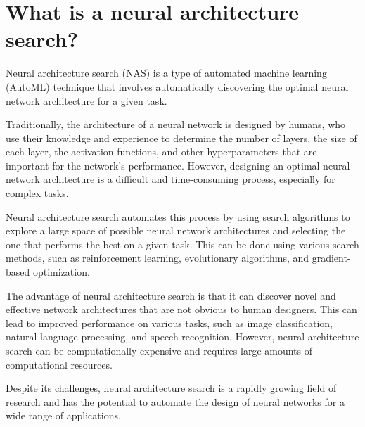 \section{What is a neural architecture search?}
Neural architecture search (NAS) is a type of automated machine learning (AutoML) technique that involves automatically discovering the optimal neural network architecture for a given task.

Traditionally, the architecture of a neural network is designed by humans, who use their knowledge and experience to determine the number of layers, the size of each layer, the activation functions, and other hyperparameters that are important for the network's performance. However, designing an optimal neural network architecture is a difficult and time-consuming process, especially for complex tasks.

Neural architecture search automates this process by using search algorithms to explore a large space of possible neural network architectures and selecting the one that performs the best on a given task. This can be done using various search methods, such as reinforcement learning, evolutionary algorithms, and gradient-based optimization.

The advantage of neural architecture search is that it can discover novel and effective network architectures that are not obvious to human designers. This can lead to improved performance on various tasks, such as image classification, natural language processing, and speech recognition. However, neural architecture search can be computationally expensive and requires large amounts of computational resources.

Despite its challenges, neural architecture search is a rapidly growing field of research and has the potential to automate the design of neural networks for a wide range of applications.

